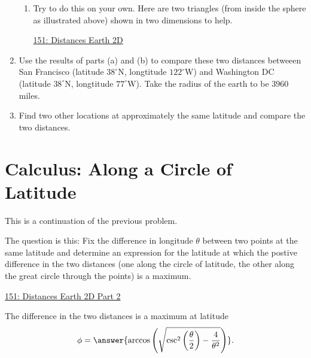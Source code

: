 \documentclass{ximera}
\begin{document}
\begin{question}
\begin{enumerate}
\begin{enumerate}
\item Try to do this on your own. Here are two triangles (from inside the sphere as illustrated above) shown in two dimensions to help.

\begin{onlineOnly}
   \begin{center}
\end{center}
\end{onlineOnly}

\href{https://www.desmos.com/calculator/wkdhhbojii}{151: Distances Earth 2D}


\end{enumerate}

\item Use the results of parts (a) and (b) to compare these two distances betweeen San Francisco (latitude $38^\circ$N, longtitude $122^\circ$W) and Washington DC  (latitude $38^\circ$N, longtitude $77^\circ$W). Take the radius of the earth to be $3960$ miles.

\item Find two other locations at approximately the same latitude and compare the two distances.

\end{enumerate}

\end{question}

\section{Calculus: Along a Circle of Latitude}
This is a continuation of the previous problem.

The question is this: Fix the difference in longitude $\theta$ between two points at the same latitude and determine an expression for the latitude at which the postive difference in the two distances (one along the circle of latitude, the other along the great circle through the points) is a maximum.

\begin{onlineOnly}
   \begin{center}
\end{center}
\end{onlineOnly}

\href{https://www.desmos.com/calculator/muhahdawza}{151: Distances Earth 2D Part 2}

The difference in the two distances is a maximum at latitude
\[
   \phi = \answer{\arccos\left( \sqrt{\csc^2 \left(\frac{\theta}{2}\right) - \frac{4}{\theta^2}} \right)} .
\]
\end{document}
